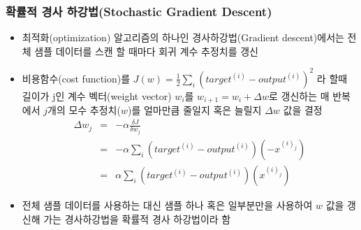 \documentclass{beamer}
\begin{document}
\begin{frame}
\frametitle{확률적 경사 하강법(Stochastic Gradient Descent)}
\begin{itemize}

\item {\scriptsize 최적화(optimization) 알고리즘의 하나인 경사하강법(Gradient descent)에서는 전체 샘플 데이터를 스캔 할 때마다 회귀 계수 추정치를 갱신}
\item {\scriptsize 비용함수(cost function)를 $J(w) = \frac{1}{2} \sum_{i}(target^{(i)} - output^{(i)})^{2}$ 라 할때 길이가 j인 계수 벡터(weight vector) $w_i$를 $w_{i+1}=w_{i}+\Delta w$로 갱신하는 매 반복에서 $j$개의 모수 추정치($w$)를 얼마만큼 줄일지 혹은 늘릴지 $\Delta w$ 값을 결정
\begin{eqnarray}
\Delta w_{j} 	&=& -\alpha \frac{\delta J}{\delta w_{j}} \\
							&=& -\alpha \sum_{i}(target^{(i)} - output^{(i)})(-x^{(i)_{j}}) \\
							&=& \alpha \sum_{i}(target^{(i)} - output^{(i)})(x^{(i)_{j}})
\end{eqnarray}
}

\item {\scriptsize 전체 샘플 데이터를 사용하는 대신 샘플 하나 혹은 일부분만을 사용하여 $w$ 값을 갱신해 가는 경사하강법을 확률적 경사 하강법이라 함}

\end{itemize}
\end{frame}






\end{document}
